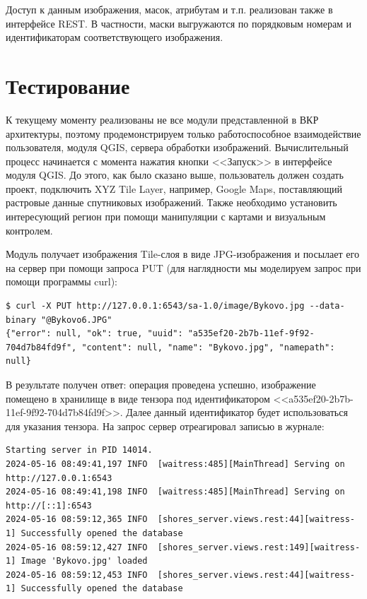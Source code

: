 \documentclass[732,fontsize=14pt,final]{studrep}
\begin{document}
Доступ к данным изображения, масок, атрибутам и т.п. реализован также в интерфейсе REST. В частности, маски выгружаются по порядковым номерам и идентификаторам соответствующего изображения.

\section{Тестирование}

К текущему моменту реализованы не все модули представленной в ВКР архитектуры, поэтому продемонстрируем только работоспособное взаимодействие пользователя, модуля QGIS, сервера обработки изображений. Вычислительный процесс начинается с момента нажатия кнопки <<Запуск>> в интерфейсе модуля QGIS. До этого, как было сказано выше, пользователь должен создать проект, подключить XYZ Tile Layer, например, Google Maps, поставляющий растровые данные спутниковых изображений. Также необходимо установить интересующий регион при помощи манипуляции с картами и визуальным контролем.

Модуль получает изображения Tile-слоя в виде JPG-изображения и посылает его на сервер при помощи запроса PUT (для наглядности мы моделируем запрос при помощи программы curl):
\begin{verbatim}
$ curl -X PUT http://127.0.0.1:6543/sa-1.0/image/Bykovo.jpg --data-binary "@Bykovo6.JPG"
{"error": null, "ok": true, "uuid": "a535ef20-2b7b-11ef-9f92-704d7b84fd9f", "content": null, "name": "Bykovo.jpg", "namepath": null}
\end{verbatim}

В результате получен ответ: операция проведена успешно, изображение помещено в хранилище в виде тензора под идентификатором <<a535ef20-2b7b-11ef-9f92-704d7b84fd9f>>. Далее данный идентификатор будет использоваться для указания тензора. На запрос сервер отреагировал записью в журнале:

\begin{verbatim}
Starting server in PID 14014.
2024-05-16 08:49:41,197 INFO  [waitress:485][MainThread] Serving on http://127.0.0.1:6543
2024-05-16 08:49:41,198 INFO  [waitress:485][MainThread] Serving on http://[::1]:6543
2024-05-16 08:59:12,365 INFO  [shores_server.views.rest:44][waitress-1] Successfully opened the database
2024-05-16 08:59:12,427 INFO  [shores_server.views.rest:149][waitress-1] Image 'Bykovo.jpg' loaded
2024-05-16 08:59:12,453 INFO  [shores_server.views.rest:44][waitress-1] Successfully opened the database
\end{verbatim}
\end{document}
